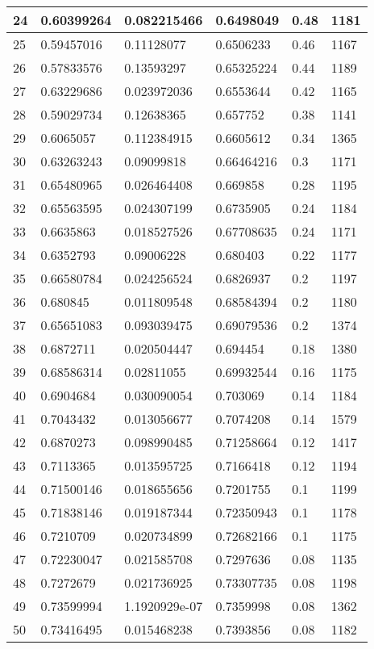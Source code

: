 \begin{longtable}{|l|l|l|l|l|l|}
24 & 0.60399264 & 0.082215466 & 0.6498049 & 0.48 & 1181 \\ \hline 
25 & 0.59457016 & 0.11128077 & 0.6506233 & 0.46 & 1167 \\ \hline 
26 & 0.57833576 & 0.13593297 & 0.65325224 & 0.44 & 1189 \\ \hline 
27 & 0.63229686 & 0.023972036 & 0.6553644 & 0.42 & 1165 \\ \hline 
28 & 0.59029734 & 0.12638365 & 0.657752 & 0.38 & 1141 \\ \hline 
29 & 0.6065057 & 0.112384915 & 0.6605612 & 0.34 & 1365 \\ \hline 
30 & 0.63263243 & 0.09099818 & 0.66464216 & 0.3 & 1171 \\ \hline 
31 & 0.65480965 & 0.026464408 & 0.669858 & 0.28 & 1195 \\ \hline 
32 & 0.65563595 & 0.024307199 & 0.6735905 & 0.24 & 1184 \\ \hline 
33 & 0.6635863 & 0.018527526 & 0.67708635 & 0.24 & 1171 \\ \hline 
34 & 0.6352793 & 0.09006228 & 0.680403 & 0.22 & 1177 \\ \hline 
35 & 0.66580784 & 0.024256524 & 0.6826937 & 0.2 & 1197 \\ \hline 
36 & 0.680845 & 0.011809548 & 0.68584394 & 0.2 & 1180 \\ \hline 
37 & 0.65651083 & 0.093039475 & 0.69079536 & 0.2 & 1374 \\ \hline 
38 & 0.6872711 & 0.020504447 & 0.694454 & 0.18 & 1380 \\ \hline 
39 & 0.68586314 & 0.02811055 & 0.69932544 & 0.16 & 1175 \\ \hline 
40 & 0.6904684 & 0.030090054 & 0.703069 & 0.14 & 1184 \\ \hline 
41 & 0.7043432 & 0.013056677 & 0.7074208 & 0.14 & 1579 \\ \hline 
42 & 0.6870273 & 0.098990485 & 0.71258664 & 0.12 & 1417 \\ \hline 
43 & 0.7113365 & 0.013595725 & 0.7166418 & 0.12 & 1194 \\ \hline 
44 & 0.71500146 & 0.018655656 & 0.7201755 & 0.1 & 1199 \\ \hline 
45 & 0.71838146 & 0.019187344 & 0.72350943 & 0.1 & 1178 \\ \hline 
46 & 0.7210709 & 0.020734899 & 0.72682166 & 0.1 & 1175 \\ \hline 
47 & 0.72230047 & 0.021585708 & 0.7297636 & 0.08 & 1135 \\ \hline 
48 & 0.7272679 & 0.021736925 & 0.73307735 & 0.08 & 1198 \\ \hline 
49 & 0.73599994 & 1.1920929e-07 & 0.7359998 & 0.08 & 1362 \\ \hline 
50 & 0.73416495 & 0.015468238 & 0.7393856 & 0.08 & 1182 \\ \hline 
\end{longtable}